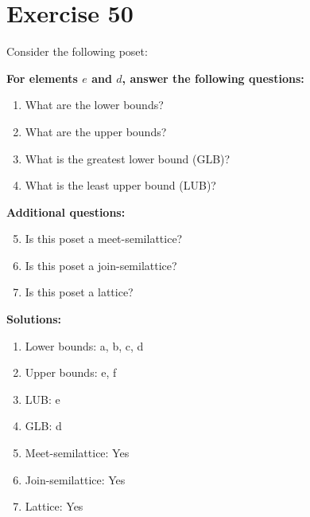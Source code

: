 \documentclass{article}
\begin{document}
\section*{Exercise 50}
Consider the following poset:
\begin{center}
\end{center}

    \textbf{For elements $e$ and $d$, answer the following questions:}
\begin{enumerate}
    \item What are the lower bounds?
    \item What are the upper bounds?
    \item What is the greatest lower bound (GLB)?
    \item What is the least upper bound (LUB)?
\end{enumerate}
    \hspace*{3ex} \textbf{Additional questions:}
\begin{enumerate}
    \setcounter{enumi}{4}
    \item Is this poset a meet-semilattice?
    \item Is this poset a join-semilattice?
    \item Is this poset a lattice?
\end{enumerate}

\textbf{Solutions:}
\begin{enumerate}
    \item Lower bounds: {a, b, c, d}
    \item Upper bounds: {e, f}
    \item LUB: e
    \item GLB: d
    \item Meet-semilattice: Yes
    \item Join-semilattice: Yes
    \item Lattice: Yes
\end{enumerate}
\newpage
\end{document}
